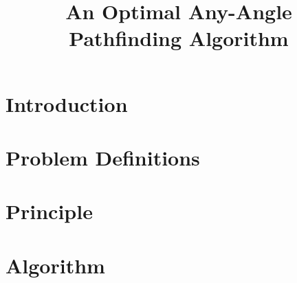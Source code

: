 \documentclass{article}
\begin{document}
\title{An Optimal Any-Angle Pathfinding Algorithm}
\maketitle

\section{Introduction}


\section{Problem Definitions}


\section{Principle}


\section{Algorithm}




\end{document}
